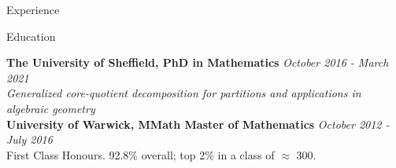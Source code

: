 \documentclass{resume} %
\begin{document}
\begin{rSection}{Experience}


\end{rSection}


\begin{rSection}{Education}
	
	{\bf The University of Sheffield, PhD in Mathematics} \hfill {\em October 2016 - March 2021} \\
	\emph{Generalized core-quotient decomposition for partitions and applications in algebraic geometry} \\
	{\bf University of Warwick, MMath Master of Mathematics} \hfill {\em October 2012 - July 2016} \\
	First Class Honours. 92.8\% overall; top 2\% in a class of $\approx$ 300.
	
\end{rSection}

\end{document}
